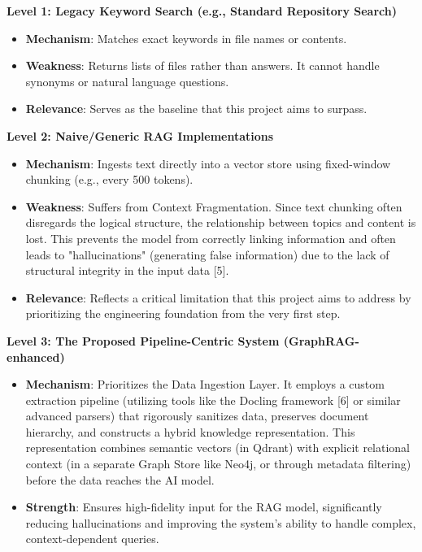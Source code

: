 \documentclass[12pt]{article}
\begin{document}
\textbf{Level 1: Legacy Keyword Search (e.g., Standard Repository Search)}
\begin{itemize}
    \item \textbf{Mechanism}: Matches exact keywords in file names or contents.
    \item \textbf{Weakness}: Returns lists of files rather than answers. It cannot handle synonyms or natural language questions.
    \item \textbf{Relevance}: Serves as the baseline that this project aims to surpass.
\end{itemize}

\textbf{Level 2: Naive/Generic RAG Implementations}
\begin{itemize}
    \item \textbf{Mechanism}: Ingests text directly into a vector store using fixed-window chunking (e.g., every 500 tokens).
    \item \textbf{Weakness}: Suffers from Context Fragmentation. Since text chunking often disregards the logical structure, the relationship between topics and content is lost. This prevents the model from correctly linking information and often leads to "hallucinations" (generating false information) due to the lack of structural integrity in the input data [5].
    \item \textbf{Relevance}: Reflects a critical limitation that this project aims to address by prioritizing the engineering foundation from the very first step.
\end{itemize}

\textbf{Level 3: The Proposed Pipeline-Centric System (GraphRAG-enhanced)}
\begin{itemize}
    \item \textbf{Mechanism}: Prioritizes the Data Ingestion Layer. It employs a custom extraction pipeline (utilizing tools like the Docling framework [6] or similar advanced parsers) that rigorously sanitizes data, preserves document hierarchy, and constructs a hybrid knowledge representation. This representation combines semantic vectors (in Qdrant) with explicit relational context (in a separate Graph Store like Neo4j, or through metadata filtering) before the data reaches the AI model.
    \item \textbf{Strength}: Ensures high-fidelity input for the RAG model, significantly reducing hallucinations and improving the system's ability to handle complex, context-dependent queries.
\end{itemize}
\end{document}
